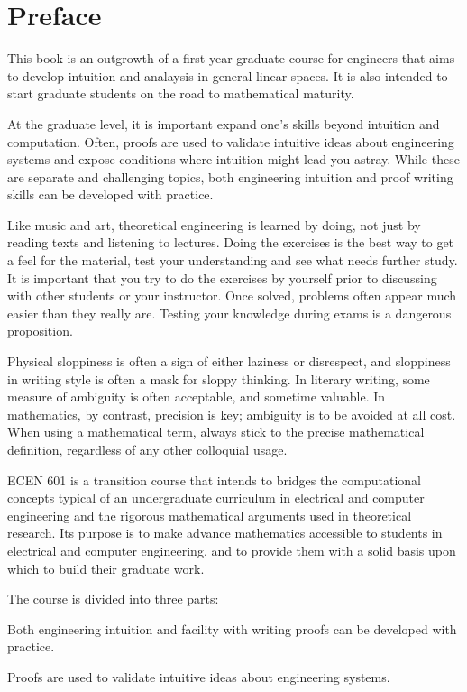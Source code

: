 \chapter*{Preface}

This book is an outgrowth of a first year graduate course for engineers
that aims to develop intuition and analaysis in general linear spaces.
It is also intended to start graduate students on the road to mathematical
maturity.

At the graduate level, it is important expand one's skills beyond intuition and computation.
Often, proofs are used to validate intuitive ideas about engineering systems and expose conditions where intuition might lead you astray.
While these are separate and challenging topics, both engineering intuition and proof writing skills can be developed with practice.

Like music and art, theoretical engineering is learned by doing, not just by reading texts and listening to lectures.
Doing the exercises is the best way to get a feel for the material, test your understanding and see what needs further study.
It is important that you try to do the exercises by yourself prior to discussing with other students or your instructor.
Once solved, problems often appear much easier than they really are.
Testing your knowledge during exams is a dangerous proposition.

Physical sloppiness is often a sign of either laziness or disrespect, and sloppiness in writing style is often a mask for sloppy thinking.
In literary writing, some measure of ambiguity is often acceptable, and sometime valuable.
In mathematics, by contrast, precision is key; ambiguity is to be avoided at all cost.
When using a mathematical term, always stick to the precise mathematical definition, regardless of any other colloquial usage.

\iffalse
ECEN 601 is a transition course that intends to bridges the computational concepts typical of an undergraduate curriculum in electrical and computer engineering and the rigorous mathematical arguments used in theoretical research.
Its purpose is to make advance mathematics accessible to students in electrical and computer engineering, and to provide them with a solid basis upon which to build their graduate work.

The course is divided into three parts:

Both engineering intuition and facility with writing proofs can be developed with practice.

Proofs are used to validate intuitive ideas about engineering systems.

